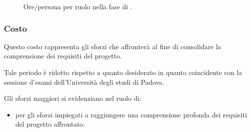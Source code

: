 \begin{figure}[H]
\caption{Ore/persona per ruolo nella fase di \ARI.}
\label{fig:ari2}

\end{figure}

\subsubsection{Costo \ARI}

\introcosto{\ARI}
Questo costo rappresenta gli sforzi che {\hx} affronterà al fine di consolidare la comprensione dei requisiti del progetto.

Tale periodo è ridotto rispetto a quanto desiderato in quanto coincidente con la sessione d'esami dell'Università degli studi di Padova. %

Gli sforzi maggiori si evidenziano nel ruolo di:
\begin{itemize}
\item {\ANx} per gli sforzi impiegati a raggiungere una comprensione profonda dei requisiti del progetto affrontato.
\end{itemize}

